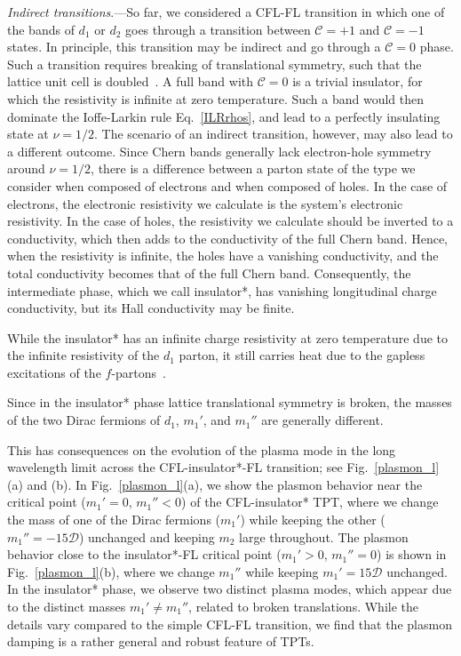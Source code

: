 \documentclass[aps,prl,twocolumn,superscriptaddress,floatfix, 10pt,longbibliography, nofootinbib]{revtex4-2}
\begin{document}
{\it Indirect transitions}.---So far, we considered a CFL-FL transition in which one of the bands of $d_1$ or $d_2$ goes through a transition between $\mathcal{C}=+1$ and $\mathcal{C}=-1$ states. In principle, this transition may be indirect and go through a $\mathcal{C}=0$ phase. Such a transition requires breaking of translational symmetry, such that the lattice unit cell is doubled~\cite{barkeshli_anyon_2010, song_phase_2024}. A full band with $\mathcal{C}=0$ is a trivial insulator, for which the resistivity is infinite at zero temperature. Such a band would then dominate the Ioffe-Larkin rule Eq.~\eqref{ILRrhos}, and lead to a perfectly insulating state at $\nu=1/2$. The scenario of an indirect transition, however, may also lead to a different outcome. Since Chern bands generally lack electron-hole symmetry around $\nu=1/2$, there is a difference between a parton state of the type we consider when composed of electrons and when composed of holes. In the case of electrons, the electronic resistivity we calculate is the system's electronic resistivity. In the case of holes, the resistivity we calculate should be inverted to a conductivity, which then adds to the conductivity of the full Chern band. Hence, when the resistivity is infinite, the holes have a vanishing conductivity, and the total conductivity becomes that of the full Chern band. Consequently, the intermediate phase, which we call insulator*, has vanishing longitudinal charge conductivity, but its Hall conductivity may be finite.


While the insulator* has an infinite charge resistivity at zero temperature due to the infinite resistivity of the $d_1$ parton, it still carries heat due to the gapless excitations of the $f$-partons~\cite{lee_gauge_1992,barkeshli_continuous_2012}.


Since in the insulator* phase lattice translational symmetry is broken, the masses of the two Dirac fermions of $d_1$, $m_1'$, and $m_1''$ are generally different.

This has consequences on the evolution of the plasma mode in the long wavelength limit across the CFL-insulator*-FL transition; see Fig.~\ref{plasmon_l}(a) and (b).
In Fig.~\ref{plasmon_l}(a), we show the plasmon behavior near the critical point ($m_1'=0$, $m_1''<0$) of the CFL-insulator* TPT, where we change the mass of one of the Dirac fermions ($m_1'$) while keeping the other ($m_1''=-15 \mathcal{D}$) unchanged and keeping $m_2$ large throughout.
The plasmon behavior close to the insulator*-FL critical point ($m_1'>0$, $m_1''=0$) is shown in Fig.~\ref{plasmon_l}(b), where we change $m_1''$ while keeping $m_1'=15\mathcal{D}$ unchanged. In the insulator* phase, we observe two distinct plasma modes, which appear due to the distinct masses $m_1' \neq m_1''$, related to broken translations.
While the details vary compared to the simple CFL-FL transition, we find that the plasmon damping is a rather general and robust feature of TPTs.
\end{document}
